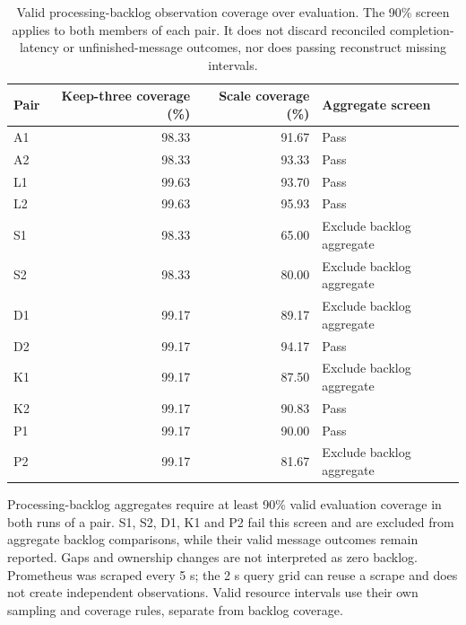 \begin{table}[!htbp]
\centering\small
\begin{tabular}{@{}lrrl@{}}
\toprule
\textbf{Pair} & \textbf{Keep-three coverage (\%)} & \textbf{Scale coverage (\%)} & \textbf{Aggregate screen}\\
\midrule

A1 & 98.33 & 91.67 & Pass\\

A2 & 98.33 & 93.33 & Pass\\

L1 & 99.63 & 93.70 & Pass\\

L2 & 99.63 & 95.93 & Pass\\

S1 & 98.33 & 65.00 & Exclude backlog aggregate\\

S2 & 98.33 & 80.00 & Exclude backlog aggregate\\

D1 & 99.17 & 89.17 & Exclude backlog aggregate\\

D2 & 99.17 & 94.17 & Pass\\

K1 & 99.17 & 87.50 & Exclude backlog aggregate\\

K2 & 99.17 & 90.83 & Pass\\

P1 & 99.17 & 90.00 & Pass\\

P2 & 99.17 & 81.67 & Exclude backlog aggregate\\

\bottomrule
\end{tabular}
\caption{Valid processing-backlog observation coverage over evaluation. The 90\% screen applies to both members of each pair. It does not discard reconciled completion-latency or unfinished-message outcomes, nor does passing reconstruct missing intervals.}
\label{tab:preliminary-coverage}
\end{table}

Processing-backlog aggregates require at least 90\% valid evaluation coverage in both runs of a pair. S1, S2, D1, K1 and P2 fail this screen and are excluded from aggregate backlog comparisons, while their valid message outcomes remain reported. Gaps and ownership changes are not interpreted as zero backlog. Prometheus was scraped every 5 s; the 2 s query grid can reuse a scrape and does not create independent observations. Valid resource intervals use their own sampling and coverage rules, separate from backlog coverage.

